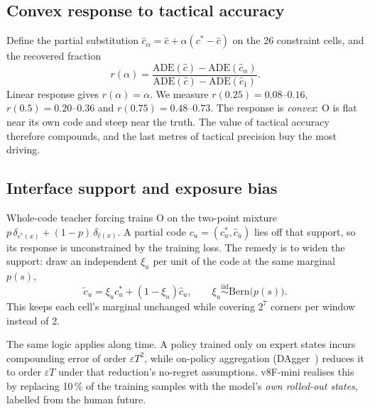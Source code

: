 \documentclass[10pt,twocolumn]{article}
\theoremstyle{remark}
\newcommand{\ADE}{\mathrm{ADE}}
\begin{document}
\subsection{Convex response to tactical accuracy}
Define the partial substitution $\hat c_\alpha=\hat c+\alpha(c^\ast-\hat c)$ on the 26 constraint cells, and the recovered fraction
\begin{equation}
r(\alpha)=\frac{\ADE(\hat c)-\ADE(\hat c_\alpha)}{\ADE(\hat c)-\ADE(\hat c_1)} .
\end{equation}
Linear response gives $r(\alpha)=\alpha$. We measure $r(0.25)=0.08$--$0.16$, $r(0.5)=0.20$--$0.36$ and $r(0.75)=0.48$--$0.73$. The
response is \emph{convex}: O is flat near its own code and steep near the truth. The value of tactical accuracy therefore compounds,
and the last metres of tactical precision buy the most driving.

\subsection{Interface support and exposure bias}
Whole-code teacher forcing trains O on the two-point mixture $p\,\delta_{c^\ast(x)}+(1-p)\,\delta_{\hat c(x)}$. A partial code
$c_u=(c^\ast_u,\hat c_{\bar u})$ lies off that support, so its response is unconstrained by the training loss. The remedy is to widen
the support: draw an independent $\xi_u$ per unit of the code at the same marginal $p(s)$,
\begin{equation}
\tilde c_u=\xi_u c^\ast_u+(1-\xi_u)\hat c_u,\qquad \xi_u\stackrel{\mathrm{iid}}{\sim}\mathrm{Bern}\big(p(s)\big).
\end{equation}
This keeps each cell's marginal unchanged while covering $2^7$ corners per window instead of 2.

The same logic applies along time. A policy trained only on expert states incurs compounding error of order $\varepsilon T^2$, while
on-policy aggregation (DAgger~\cite{dagger}) reduces it to order $\varepsilon T$ under that reduction's no-regret assumptions. v8F-mini realises this by replacing 10\,\% of the
training samples with the model's \emph{own rolled-out states}, labelled from the human future.
\end{document}
